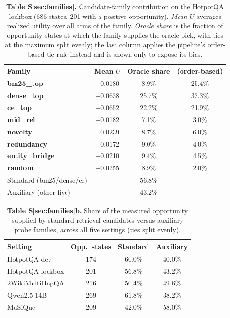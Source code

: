 \begin{table}[h]
\centering
\small
\caption{\textbf{Table S\ref{sec:families}.} Candidate-family contribution on the HotpotQA lockbox (686 states, 201 with a positive opportunity). \emph{Mean $U$} averages realized utility over all arms of the family. \emph{Oracle share} is the fraction of opportunity states at which the family supplies the oracle pick, with ties at the maximum split evenly; the last column applies the pipeline's order-based tie rule instead and is shown only to expose its bias.}
\label{tab:families}
\begin{tabular}{lccc}
\toprule
\textbf{Family} & \textbf{Mean $U$} & \textbf{Oracle share} & \textbf{(order-based)} \\
\midrule
\textbf{bm25\_top} & +0.0180 & 8.9\% & 25.4\% \\
\textbf{dense\_top} & +0.0638 & 25.7\% & 33.3\% \\
\textbf{ce\_top} & +0.0652 & 22.2\% & 21.9\% \\
\textbf{mid\_rel} & +0.0182 & 7.1\% & 3.0\% \\
\textbf{novelty} & +0.0239 & 8.7\% & 6.0\% \\
\textbf{redundancy} & +0.0172 & 9.0\% & 4.0\% \\
\textbf{entity\_bridge} & +0.0210 & 9.4\% & 4.5\% \\
\textbf{random} & +0.0255 & 8.9\% & 2.0\% \\
\midrule
Standard (bm25/dense/ce) & --- & 56.8\% & --- \\
Auxiliary (other five) & --- & 43.2\% & --- \\
\bottomrule
\end{tabular}
\end{table}

\begin{table}[h]
\centering
\small
\caption{\textbf{Table S\ref{sec:families}b.} Share of the measured opportunity supplied by standard retrieval candidates versus auxiliary probe families, across all five settings (ties split evenly).}
\begin{tabular}{lccc}
\toprule
\textbf{Setting} & \textbf{Opp.\ states} & \textbf{Standard} & \textbf{Auxiliary} \\
\midrule
HotpotQA dev & 174 & 60.0\% & 40.0\% \\
HotpotQA lockbox & 201 & 56.8\% & 43.2\% \\
2WikiMultiHopQA & 216 & 50.4\% & 49.6\% \\
Qwen2.5-14B & 269 & 61.8\% & 38.2\% \\
MuSiQue & 209 & 42.0\% & 58.0\% \\
\bottomrule
\end{tabular}
\end{table}
